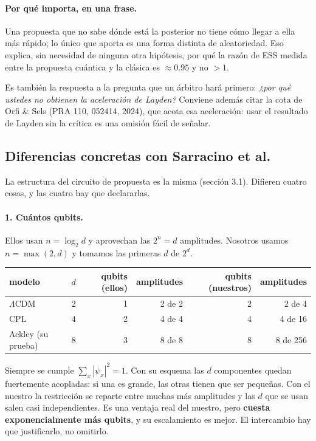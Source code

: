 \documentclass[11pt,a4paper]{article}
\begin{document}
\paragraph{Por qué importa, en una frase.} Una propuesta que no sabe dónde
está la posterior no tiene cómo llegar a ella más rápido; lo único que
aporta es una forma distinta de aleatoriedad. Eso explica, sin necesidad de
ninguna otra hipótesis, por qué la razón de ESS medida entre la propuesta
cuántica y la clásica es $\approx 0.95$ y no $> 1$.

Es también la respuesta a la pregunta que un árbitro hará primero:
\emph{¿por qué ustedes no obtienen la aceleración de Layden?} Conviene
además citar la cota de Orfi \& Sels (PRA 110, 052414, 2024), que acota esa
aceleración: usar el resultado de Layden sin la crítica es una omisión
fácil de señalar.

\subsection{Diferencias concretas con Sarracino et al.}

La estructura del circuito de propuesta es la misma (sección 3.1). Difieren
cuatro cosas, y las cuatro hay que declararlas.

\paragraph{1. Cuántos qubits.} Ellos usan $n=\log_2 d$ y aprovechan las
$2^n = d$ amplitudes. Nosotros usamos $n=\max(2,d)$ y tomamos las primeras
$d$ de $2^d$.

\begin{center}
\small
\begin{tabular}{lrrrrr}
\toprule
modelo & $d$ & qubits (ellos) & amplitudes & qubits (nuestros) & amplitudes \\
\midrule
$\Lambda$CDM       & 2 & 1 & 2 de 2 & 2 & 2 de 4 \\
CPL                & 4 & 2 & 4 de 4 & 4 & 4 de 16 \\
Ackley (su prueba) & 8 & 3 & 8 de 8 & 8 & 8 de 256 \\
\bottomrule
\end{tabular}
\end{center}

\noindent
Siempre se cumple $\sum_x |\psi_x|^2 = 1$. Con su esquema las $d$
componentes quedan fuertemente acopladas: si una es grande, las otras
tienen que ser pequeñas. Con el nuestro la restricción se reparte entre
muchas más amplitudes y las $d$ que se usan salen casi independientes. Es
una ventaja real del nuestro, pero \textbf{cuesta exponencialmente más
qubits}, y su escalamiento es mejor. El intercambio hay que justificarlo,
no omitirlo.
\end{document}
